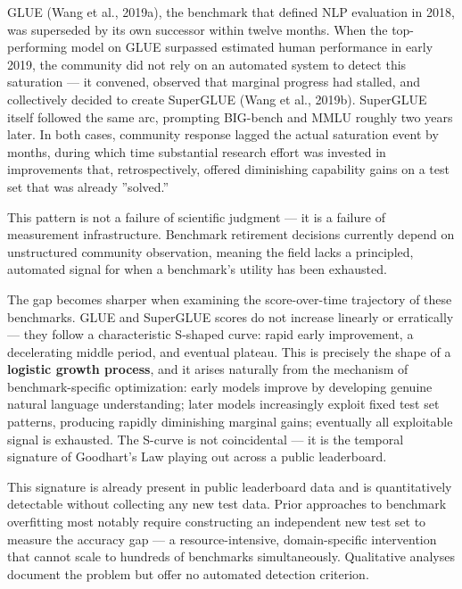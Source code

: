 
GLUE (Wang et al., 2019a), the benchmark that defined NLP evaluation in 2018, was superseded by its own successor within twelve months. When the top-performing model on GLUE surpassed estimated human performance in early 2019, the community did not rely on an automated system to detect this saturation --- it convened, observed that marginal progress had stalled, and collectively decided to create SuperGLUE (Wang et al., 2019b). SuperGLUE itself followed the same arc, prompting BIG-bench \citep{srivastava2022bigbench} and MMLU \citep{hendrycks2021mmlu} roughly two years later. In both cases, community response lagged the actual saturation event by months, during which time substantial research effort was invested in improvements that, retrospectively, offered diminishing capability gains on a test set that was already ''solved.''

This pattern is not a failure of scientific judgment --- it is a failure of measurement infrastructure. Benchmark retirement decisions currently depend on unstructured community observation, meaning the field lacks a principled, automated signal for when a benchmark's utility has been exhausted.

The gap becomes sharper when examining the score-over-time trajectory of these benchmarks. GLUE and SuperGLUE scores do not increase linearly or erratically --- they follow a characteristic S-shaped curve: rapid early improvement, a decelerating middle period, and eventual plateau. This is precisely the shape of a \textbf{logistic growth process}, and it arises naturally from the mechanism of benchmark-specific optimization: early models improve by developing genuine natural language understanding; later models increasingly exploit fixed test set patterns, producing rapidly diminishing marginal gains; eventually all exploitable signal is exhausted. The S-curve is not coincidental --- it is the temporal signature of Goodhart's Law \citep{goodhart1975problems} playing out across a public leaderboard.

This signature is already present in public leaderboard data and is quantitatively detectable without collecting any new test data. Prior approaches to benchmark overfitting most notably require constructing an independent new test set to measure the accuracy gap \citep{recht2019imagenet} --- a resource-intensive, domain-specific intervention that cannot scale to hundreds of benchmarks simultaneously. Qualitative analyses document the problem but offer no automated detection criterion.

